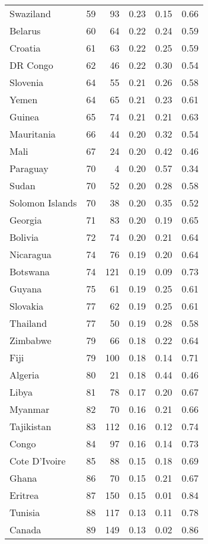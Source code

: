 \begin{longtable}[t]{lrrrrr}
Swaziland & 59 & 93 & 0.23 & 0.15 & 0.66\\
Belarus & 60 & 64 & 0.22 & 0.24 & 0.59\\
\addlinespace
Croatia & 61 & 63 & 0.22 & 0.25 & 0.59\\
DR Congo & 62 & 46 & 0.22 & 0.30 & 0.54\\
Slovenia & 64 & 55 & 0.21 & 0.26 & 0.58\\
Yemen & 64 & 65 & 0.21 & 0.23 & 0.61\\
Guinea & 65 & 74 & 0.21 & 0.21 & 0.63\\
\addlinespace
Mauritania & 66 & 44 & 0.20 & 0.32 & 0.54\\
Mali & 67 & 24 & 0.20 & 0.42 & 0.46\\
Paraguay & 70 & 4 & 0.20 & 0.57 & 0.34\\
Sudan & 70 & 52 & 0.20 & 0.28 & 0.58\\
Solomon Islands & 70 & 38 & 0.20 & 0.35 & 0.52\\
\addlinespace
Georgia & 71 & 83 & 0.20 & 0.19 & 0.65\\
Bolivia & 72 & 74 & 0.20 & 0.21 & 0.64\\
Nicaragua & 74 & 76 & 0.19 & 0.20 & 0.64\\
Botswana & 74 & 121 & 0.19 & 0.09 & 0.73\\
Guyana & 75 & 61 & 0.19 & 0.25 & 0.61\\
\addlinespace
Slovakia & 77 & 62 & 0.19 & 0.25 & 0.61\\
Thailand & 77 & 50 & 0.19 & 0.28 & 0.58\\
Zimbabwe & 79 & 66 & 0.18 & 0.22 & 0.64\\
Fiji & 79 & 100 & 0.18 & 0.14 & 0.71\\
Algeria & 80 & 21 & 0.18 & 0.44 & 0.46\\
\addlinespace
Libya & 81 & 78 & 0.17 & 0.20 & 0.67\\
Myanmar & 82 & 70 & 0.16 & 0.21 & 0.66\\
Tajikistan & 83 & 112 & 0.16 & 0.12 & 0.74\\
Congo & 84 & 97 & 0.16 & 0.14 & 0.73\\
Cote D'Ivoire & 85 & 88 & 0.15 & 0.18 & 0.69\\
\addlinespace
Ghana & 86 & 70 & 0.15 & 0.21 & 0.67\\
Eritrea & 87 & 150 & 0.15 & 0.01 & 0.84\\
Tunisia & 88 & 117 & 0.13 & 0.11 & 0.78\\
Canada & 89 & 149 & 0.13 & 0.02 & 0.86\\

\end{longtable}
